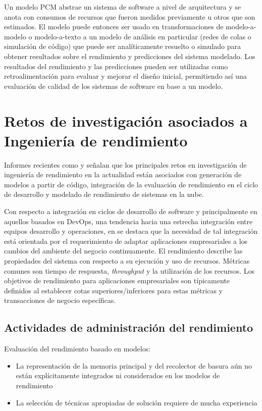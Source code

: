 \documentclass[11pt, twoside]{report}
\begin{document}
Un modelo PCM abstrae un sistema de software a nivel de arquitectura y se anota con consumos de recursos que fueron medidos previamente u otros que son estimados. El modelo puede entonces ser usado en transformaciones de modelo-a-modelo o modelo-a-texto a un modelo de análisis en particular (redes de colas o simulación de código) que puede ser analíticamente resuelto o simulado para obtener resultados sobre el rendimiento y predicciones del sistema modelado. Los resultados del rendimiento y las predicciones pueden ser utilizadas como retroalimentación para evaluar y mejorar el diseño inicial, permitiendo así una evaluación de calidad de los sistemas de software en base a un modelo\cite{noorshams}. 

\section{Retos de investigación asociados a Ingeniería de rendimiento}
Informes recientes como \cite{microservices-challenges} y \cite{performance-devops} señalan que los principales retos en investigación de ingeniería de rendimiento en la actualidad están asociados con generación de modelos a partir de código, integración de la evaluación de rendimiento en el ciclo de desarrollo y modelado de rendimiento de sistemas en la nube.

Con respecto a integración en ciclos de desarrollo de software y principalmente en aquellos basados en DevOps, una tendencia hacia una estrecha integración entre equipos desarrollo y operaciones, en \cite{performance-devops} se destaca que la necesidad de tal integración está orientada por el requerimiento de adaptar aplicaciones empresariales a los cambios del ambiente del negocio continuamente. El rendimiento describe las propiedades del sistema con respecto a su ejecución y uso de recursos. Métricas comunes son tiempo de respuesta, \emph{throughput} y la utilización de los recursos. Los objetivos de rendimiento para aplicaciones empresariales son típicamente definidos al establecer cotas superiores/inferiores para estas métricas y transacciones de negocio específicas. 

\subsection{Actividades de administración del rendimiento}
Evaluación del rendimiento basado en modelos:
\begin{itemize}
    \item La representación de la memoria principal y del recolector de basura aún no están explícitamente integrados ni considerados en los modelos de rendimiento
    \item La selección de técnicas apropiadas de solución requiere de mucha experiencia
\end{itemize}
\end{document}
